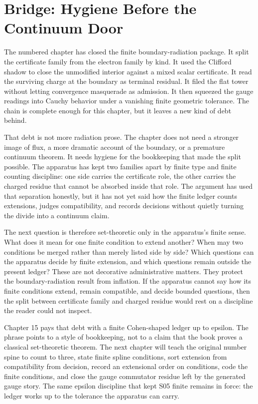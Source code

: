 \section*{Bridge: Hygiene Before the Continuum Door}

The numbered chapter has closed the finite boundary-radiation package. It split
the certificate family from the electron family by kind. It used the Clifford
shadow to close the unmodified interior against a mixed scalar certificate. It
read the surviving charge at the boundary as terminal residual. It filed the
flat tower without letting convergence masquerade as admission. It then squeezed
the gauge readings into Cauchy behavior under a vanishing finite geometric
tolerance. The chain is complete enough for this chapter, but it leaves a new
kind of debt behind.

That debt is not more radiation prose. The chapter does not need a stronger
image of flux, a more dramatic account of the boundary, or a premature continuum
theorem. It needs hygiene for the bookkeeping that made the split possible. The
apparatus has kept two families apart by finite type and finite counting
discipline: one side carries the certificate role, the other carries the
charged residue that cannot be absorbed inside that role. The argument has used
that separation honestly, but it has not yet said how the finite ledger counts
extensions, judges compatibility, and records decisions without quietly turning
the divide into a continuum claim.

The next question is therefore set-theoretic only in the apparatus's finite
sense. What does it mean for one finite condition to extend another? When may
two conditions be merged rather than merely listed side by side? Which questions
can the apparatus decide by finite extension, and which questions remain outside
the present ledger? These are not decorative administrative matters. They
protect the boundary-radiation result from inflation. If the apparatus cannot
say how its finite conditions extend, remain compatible, and decide bounded
questions, then the split between certificate family and charged residue would
rest on a discipline the reader could not inspect.

Chapter 15 pays that debt with a finite Cohen-shaped ledger up to epsilon. The
phrase points to a style of bookkeeping, not to a claim that the book proves a
classical set-theoretic theorem. The next chapter will teach the original number
spine to count to three, state finite spline conditions, sort extension from
compatibility from decision, record an extensional order on conditions, code the
finite conditions, and close the gauge commutator residue left by the generated
gauge story. The same epsilon discipline that kept S05 finite remains in force:
the ledger works up to the tolerance the apparatus can carry.

